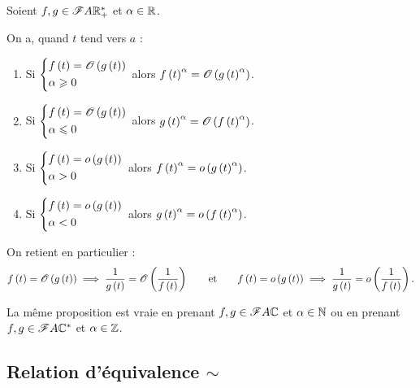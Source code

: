 \begin{prop}[Puissances]
Soient \(f,g\in\mathscr{F}{A}{\mathbb{R}_+^*}\) et \(\alpha\in\mathbb{R}\).

On a, quand \(t\) tend vers \(a\) :

\begin{enumerate}
    \item Si \(\begin{dcases}
        f\left(t\right)=\mathscr{O}\left(g\left(t\right)\right) \\
        \alpha\geqslant0
    \end{dcases}\) alors \(f\left(t\right)^\alpha=\mathscr{O}\left(g\left(t\right)^\alpha\right)\). \\
    \item Si \(\begin{dcases}
        f\left(t\right)=\mathscr{O}\left(g\left(t\right)\right) \\
        \alpha\leqslant0
    \end{dcases}\) alors \(g\left(t\right)^\alpha=\mathscr{O}\left(f\left(t\right)^\alpha\right)\). \\
    \item Si \(\begin{dcases}
        f\left(t\right)=o\left(g\left(t\right)\right) \\
        \alpha>0
    \end{dcases}\) alors \(f\left(t\right)^\alpha=o\left(g\left(t\right)^\alpha\right)\). \\
    \item Si \(\begin{dcases}
        f\left(t\right)=o\left(g\left(t\right)\right) \\
        \alpha<0
    \end{dcases}\) alors \(g\left(t\right)^\alpha=o\left(f\left(t\right)^\alpha\right)\).
\end{enumerate}

On retient en particulier : \[f\left(t\right)=\mathscr{O}\left(g\left(t\right)\right)\implies\dfrac{1}{g\left(t\right)}=\mathscr{O}\left(\dfrac{1}{f\left(t\right)}\right)\qquad\text{et}\qquad f\left(t\right)=o\left(g\left(t\right)\right)\implies\dfrac{1}{g\left(t\right)}=o\left(\dfrac{1}{f\left(t\right)}\right).\]

La même proposition est vraie en prenant \(f,g\in\mathscr{F}{A}{\mathbb{C}}\) et \(\alpha\in\mathbb{N}\) ou en prenant \(f,g\in\mathscr{F}{A}{\mathbb{C}^*}\) et \(\alpha\in\mathbb{Z}\).
\end{prop}

\subsection{Relation d'équivalence \(\sim\)}

